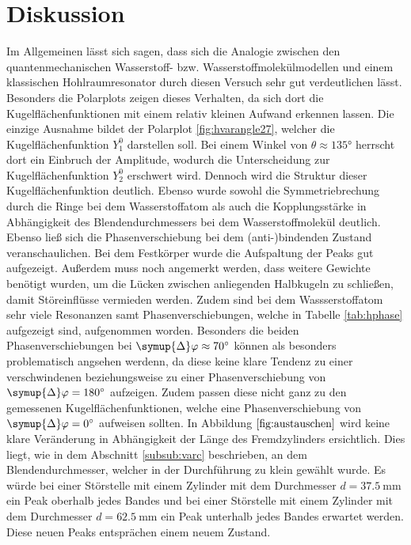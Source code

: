\section{Diskussion}
\label{sec:Diskussion}
Im Allgemeinen lässt sich sagen, dass sich die Analogie zwischen den quantenmechanischen Wasserstoff- bzw. Wasserstoffmolekülmodellen und einem klassischen 
Hohlraumresonator durch diesen Versuch sehr gut verdeutlichen lässt. 
Besonders die Polarplots zeigen dieses Verhalten, da sich dort die Kugelflächenfunktionen mit einem relativ kleinen Aufwand erkennen lassen. Die einzige Ausnahme bildet
der Polarplot \ref{fig:hvarangle27}, welcher die Kugelflächenfunktion $Y_1^0$ darstellen soll. 
Bei einem Winkel von $\theta \approx \ang{135}$ herrscht dort ein Einbruch der Amplitude, wodurch die Unterscheidung zur Kugelflächenfunktion $Y_2^0$ erschwert wird.
Dennoch wird die Struktur dieser Kugelflächenfunktion deutlich.
Ebenso wurde sowohl die Symmetriebrechung durch die Ringe bei dem Wasserstoffatom als auch die Kopplungsstärke in Abhängigkeit des Blendendurchmessers bei
dem Wasserstoffmolekül deutlich.
Ebenso ließ sich die Phasenverschiebung bei dem (anti-)bindenden Zustand veranschaulichen.
Bei dem Festkörper wurde die Aufspaltung der Peaks gut aufgezeigt.
Außerdem muss noch angemerkt werden, dass weitere Gewichte benötigt wurden, um die Lücken zwischen anliegenden Halbkugeln zu schließen, damit Störeinflüsse 
vermieden werden.
Zudem sind bei dem Wassserstoffatom sehr viele Resonanzen samt Phasenverschiebungen, welche in Tabelle
\ref{tab:hphase} aufgezeigt sind, aufgenommen worden. 
Besonders die beiden Phasenverschiebungen bei $\symup{\Delta}\varphi \approx \ang{70}$ können als besonders problematisch angsehen werdenn,
da diese keine klare Tendenz zu einer verschwindenen beziehungsweise zu einer Phasenverschiebung von
$\symup{\Delta}\varphi = \ang{180}$ aufzeigen. Zudem passen diese nicht ganz zu den gemessenen Kugelflächenfunktionen, welche
eine Phasenverschiebung von $\symup{\Delta}\varphi = \ang{0}$ aufweisen sollten.
In Abbildung $\ref{fig:austauschen}$ wird keine klare Veränderung in Abhängigkeit der Länge des Fremdzylinders ersichtlich. 
Dies liegt, wie in dem Abschnitt \ref{subsub:varc} beschrieben, an dem Blendendurchmesser, welcher in der Durchführung 
zu klein gewählt wurde.
Es würde bei einer Störstelle mit einem Zylinder mit dem Durchmesser $d = \qty{37.5}{\milli\meter}$ ein Peak oberhalb jedes Bandes und bei einer Störstelle 
mit einem Zylinder mit dem Durchmesser $d = \qty{62.5}{\milli\meter}$ ein Peak unterhalb jedes Bandes erwartet werden.
Diese neuen Peaks entsprächen einem neuem Zustand.
